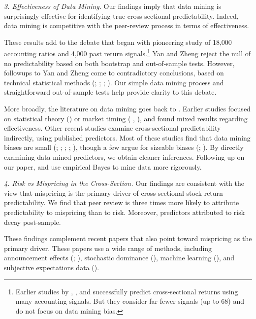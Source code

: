 \textit{3. Effectiveness of Data Mining.} Our findings imply that data mining is surprisingly effective for identifying true cross-sectional predictability. Indeed, data mining is competitive with the peer-review process in terms of effectiveness. 

These results add to the debate that began with  pioneering study of 18,000 accounting ratios and 4,000 past return signals.\footnote{%
Earlier studies by \citet{ou1989financial}, \citet{abarbanell1998abnormal}, and \citet{haugen1996commonality} successfully predict cross-sectional returns using many accounting signals. But they consider far fewer signals (up to 68) and do not focus on data mining bias.
} %
Yan and Zheng reject the null of no predictability based on both bootstrap and out-of-sample tests. However, followups to Yan and Zheng come to contradictory conclusions, based on technical statistical methods (\citealt{Chordia2020Anomalies}; \citealt{harvey2020false}; \citealt{chen2024most}; \citealt{gotofalse}). Our simple data mining process and straightforward out-of-sample tests help provide clarity to this debate.

More broadly, the literature on data mining goes back to \citet{Jensen1970Random}. Earlier studies focused on statistical theory (\citealt{Lo1990Data}) or market timing (\citeauthor{sullivan1999data} \citeyear{sullivan1999data}, \citeyear{sullivan2001dangers}), and found mixed results regarding effectiveness. Other recent studies examine cross-sectional predictability indirectly, using published predictors. Most of these studies find that data mining biases are small (\citealt{mclean2016does}; \citealt{chen2020publication}; \citealt{Jacobs2020Anomalies}; \citealt{jensen2022there};  \citealt{chen2025t}), though a few argue for sizeable biases (\citealt{harvey2016and}; \citealt{hasler2023looking}). By directly examining data-mined predictors, we obtain cleaner inferences. Following up on our paper, \citet{chen2023high} and \citet{marrow2024real} use empirical Bayes to mine data more rigorously. 


\textit{4. Risk vs Mispricing in the Cross-Section.} Our findings are consistent with the view that mispricing is the primary driver of cross-sectional stock return predictability. We find that peer review is three times more likely to attribute predictability to mispricing than to risk. Moreover, predictors attributed to risk decay post-sample.

These findings complement recent papers that also point toward mispricing as the primary driver. These papers use a wide range of methods, including announcement effects (\citealt{Engelberg2018Anomalies}; \citealt{frey2023stock}), stochastic dominance (\citealt{holcblat2022anomaly}), machine learning (\citealt{bali2023expected}), and subjective expectations data (\citealt{jensen2024subjective}). 



